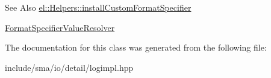 \begin{DoxySeeAlso}{See Also}
\hyperlink{classel_1_1Helpers_aa6de15a09db4f2a6763a6652c0ea12b1}{el\-::\-Helpers\-::install\-Custom\-Format\-Specifier} 

\hyperlink{namespaceel_a4d34c3ab99de9d5d2e531884d50bda3b}{Format\-Specifier\-Value\-Resolver} 
\end{DoxySeeAlso}


The documentation for this class was generated from the following file\-:\begin{DoxyCompactItemize}
\item 
include/sma/io/detail/logimpl.\-hpp\end{DoxyCompactItemize}
